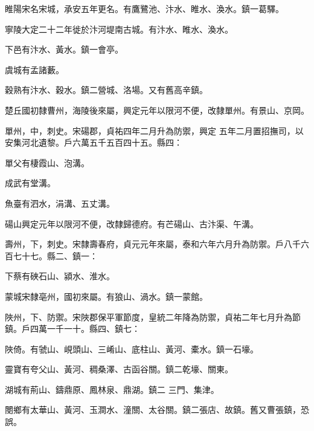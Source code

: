 \begin{pinyinscope}
 睢陽宋名宋城，承安五年更名。有鷹鷺池、汴水、睢水、渙水。鎮一葛驛。



 寧陵大定二十二年徙於汴河堤南古城。有汴水、睢水、渙水。



 下邑有汴水、黃水。鎮一會亭。



 虞城有孟諸藪。



 穀熟有汴水、穀水。鎮二營城、洛場。又有舊高辛鎮。



 楚丘國初隸曹州，海陵後來屬，興定元年以限河不便，改隸單州。有景山、京岡。



 單州，中，刺史。宋碭郡，貞祐四年二月升為防禦，興定
 五年二月置招撫司，以安集河北遺黎。戶六萬五千五百四十五。縣四：



 單父有棲霞山、泡溝。



 成武有堂溝。



 魚臺有泗水，涓溝、五丈溝。



 碭山興定元年以限河不便，改隸歸德府。有芒碭山、古汴渠、午溝。



 壽州，下，刺史。宋隸壽春府，貞元元年來屬，泰和六年六月升為防禦。戶八千六百七十七。縣二、鎮一：



 下蔡有硤石山、潁水、淮水。



 蒙城宋隸亳州，國初來屬。有狼山、渦水。鎮一蒙館。



 陜州，下、防禦。宋陜郡保平軍節度，皇統二年降為防禦，貞祐二年七月升為節鎮。戶四萬一千一十。縣四、鎮七：



 陜倚。有虢山、峴頭山、三崤山、底柱山、黃河、橐水。鎮一石壕。



 靈寶有夸父山、黃河、稠桑澤、古函谷關。鎮二乾壕、關東。



 湖城有荊山、鑄鼎原、鳳林泉、鼎湖。鎮二
 三門、集津。



 閿鄉有太華山、黃河、玉澗水、潼關、太谷關。鎮二張店、故鎮。舊又曹張鎮，恐誤。




\end{pinyinscope}
